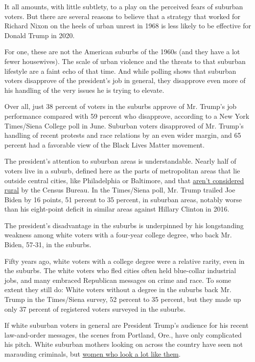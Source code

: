 It all amounts, with little subtlety, to a play on the perceived fears
of suburban voters. But there are several reasons to believe that a
strategy that worked for Richard Nixon on the heels of urban unrest in
1968 is less likely to be effective for Donald Trump in 2020.

For one, these are not the American suburbs of the 1960s (and they have
a lot fewer housewives). The scale of urban violence and the threats to
that suburban lifestyle are a faint echo of that time. And while polling
shows that suburban voters disapprove of the president's job in general,
they disapprove even more of his handling of the very issues he is
trying to elevate.

Over all, just 38 percent of voters in the suburbs approve of Mr.
Trump's job performance compared with 59 percent who disapprove,
according to a New York Times/Siena College poll in June. Suburban
voters disapproved of Mr. Trump's handling of recent protests and race
relations by an even wider margin, and 65 percent had a favorable view
of the Black Lives Matter movement.

The president's attention to suburban areas is understandable. Nearly
half of voters live in a suburb, defined here as the parts of
metropolitan areas that lie outside central cities, like Philadelphia or
Baltimore, and that
\href{https://www.census.gov/programs-surveys/geography/guidance/geo-areas/urban-rural/2010-urban-rural.html}{aren't
considered rural} by the Census Bureau. In the Times/Siena poll, Mr.
Trump trailed Joe Biden by 16 points, 51 percent to 35 percent, in
suburban areas, notably worse than his eight-point deficit in similar
areas against Hillary Clinton in 2016.

The president's disadvantage in the suburbs is underpinned by his
longstanding weakness among white voters with a four-year college
degree, who back Mr. Biden, 57-31, in the suburbs.

Fifty years ago, white voters with a college degree were a relative
rarity, even in the suburbs. The white voters who fled cities often held
blue-collar industrial jobs, and many embraced Republican messages on
crime and race. To some extent they still do: White voters without a
degree in the suburbs back Mr. Trump in the Times/Siena survey, 52
percent to 35 percent, but they made up only 37 percent of registered
voters surveyed in the suburbs.

If white suburban voters in general are President Trump's audience for
his recent law-and-order messages, the scenes from Portland, Ore., have
only complicated his pitch. White suburban mothers looking on across the
country have seen not marauding criminals, but
\href{https://www.nytimes3xbfgragh.onion/2020/07/27/parenting/wall-of-moms-protests.html?action=click\&module=Top\%20Stories\&pgtype=Homepage}{women
who look a lot like them}.

